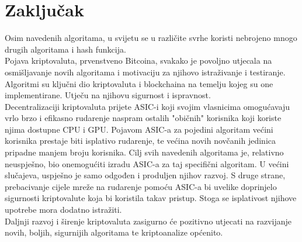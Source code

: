 \documentclass[12pt]{article}
\providecommand\phantomsection{}
\begin{document}
\section{Zaključak}
Osim navedenih algoritama, u svijetu se u različite svrhe koristi nebrojeno mnogo drugih algoritama i hash funkcija.\\
Pojava kriptovaluta, prvenstveno Bitcoina, svakako je povoljno utjecala na osmišljavanje novih algoritama i motivaciju za njihovo istraživanje i testiranje. \\
Algoritmi su ključni dio kriptovaluta i blockchaina na temelju kojeg su one implementirane. Utječu na njihovu sigurnost i ispravnost.\\
Decentralizaciji kriptovaluta prijete ASIC-i koji svojim vlasnicima omogućavaju vrlo brzo i efikasno rudarenje naspram ostalih "običnih" korisnika koji koriste njima dostupne CPU i GPU. Pojavom ASIC-a za pojedini algoritam većini korisnika prestaje biti isplativo rudarenje, te većina novih novčanih jedinica pripadne manjem broju korisnika. Cilj svih navedenih algoritama je, relativno neuspješno, bio onemogućiti izradu ASIC-a za taj specifični algoritam. U većini slučajeva, uspješno je samo odgođen i produljen njihov razvoj. S druge strane, prebacivanje cijele mreže na rudarenje pomoću ASIC-a bi uvelike doprinjelo sigurnosti kriptovalute koja bi koristila takav pristup.\cite{asic-plus} Stoga se isplativost njihove upotrebe mora dodatno istražiti.\\
Daljnji razvoj i širenje kriptovaluta zasigurno će pozitivno utjecati na razvijanje novih, boljih, sigurnijih algoritama te kriptoanalize općenito.


\pagebreak


\phantomsection
{}




	
\end{document}
